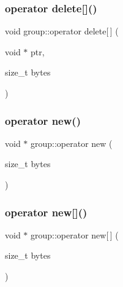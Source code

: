 \mbox{\label{classgroup_a17e8505bd7a8bf87eea1df46ab09f078}} 
\subsubsection{\texorpdfstring{operator delete[]()}{operator delete[]()}}
{\footnotesize\ttfamily void group\+::operator delete\mbox{[}$\,$\mbox{]} (\begin{DoxyParamCaption}\item[{void $\ast$}]{ptr,  }\item[{size\+\_\+t}]{bytes }\end{DoxyParamCaption})}

\mbox{\label{classgroup_ab08eef442f3de180d318a193a552ea62}} 
\subsubsection{\texorpdfstring{operator new()}{operator new()}}
{\footnotesize\ttfamily void $\ast$ group\+::operator new (\begin{DoxyParamCaption}\item[{size\+\_\+t}]{bytes }\end{DoxyParamCaption})}

\mbox{\label{classgroup_af6a6a483cf4b50f0d7bde93868a99188}} 
\subsubsection{\texorpdfstring{operator new[]()}{operator new[]()}}
{\footnotesize\ttfamily void $\ast$ group\+::operator new\mbox{[}$\,$\mbox{]} (\begin{DoxyParamCaption}\item[{size\+\_\+t}]{bytes }\end{DoxyParamCaption})}

\mbox{\label{classgroup_a36f1034ef2d4a7d1e7a5aed426bd4d16}} 
